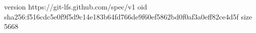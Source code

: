 version https://git-lfs.github.com/spec/v1
oid sha256:f516cdc5e0f9f5d9c14e183b64fd766de9f60ef5862bd0f0af3a0eff82ce4d5f
size 5668
